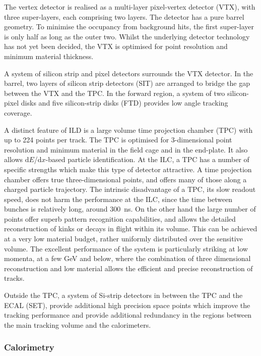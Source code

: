 The vertex detector is realised as a multi-layer pixel-vertex detector
(VTX), with three super-layers, each comprising two layers. The
detector
 has a pure barrel geometry. To minimise the occupancy from background hits,
the first super-layer is only half as long as the outer two. Whilst the underlying detector technology has not yet been decided, 
the VTX is optimised for point resolution and
 minimum material thickness. 
	
A system of silicon strip and pixel detectors surrounds the VTX detector. In the barrel, two layers of silicon strip detectors (SIT) are arranged to bridge the gap between the VTX and the TPC. In the forward region, a system of two silicon-pixel disks and five silicon-strip disks (FTD) provides low angle tracking coverage.

A distinct feature of ILD is a large volume time projection chamber
(TPC) with up to 224 points per track. The TPC is optimised for
3-dimensional point resolution and minimum material in the field cage
and in the end-plate. It also allows d$E$/d$x$-based particle
identification. At the ILC,  a TPC has a number of specific strengths
 which make this type of detector attractive. A time projection
 chamber offers true three-dimensional points, and offers many of
 those along a charged particle trajectory. The intrinsic disadvantage
 of a TPC, its slow readout speed, does not harm the
 performance at the ILC, since the time between bunches is relatively
 long, around 300~ns. On the other hand the large number of
 points offer superb pattern recognition capabilities, and allows the
 detailed reconstruction of kinks or decays in flight within its
 volume. This can be achieved at a very low material budget, rather
 uniformly distributed over the sensitive volume. The excellent
 performance of the system is particularly striking at low momenta, at
 a few GeV and below, where the combination of three dimensional
 reconstruction and low material 
allows the efficient and precise reconstruction of tracks. 

Outside the TPC, a system of Si-strip detectors in between the TPC and
the ECAL (SET), provide additional high precision space points which
 improve the tracking performance and provide additional
    redundancy in the regions between the main tracking volume and the
    calorimeters. 

\subsubsection{Calorimetry}

